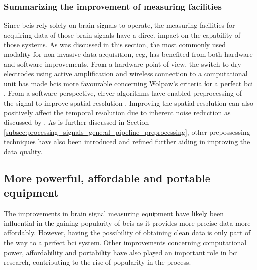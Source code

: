 
\subsubsection{Summarizing the improvement of measuring facilities}
\label{subsubsec:bci_gaining_popularity_better_measuring_summary}

Since \glspl{bci} rely solely on brain signals to operate, the measuring facilities for acquiring data of those brain signals have a direct impact on the capability of those systems.
As was discussed in this section, the most commonly used modality for non-invasive data acquisition, \gls{eeg}, has benefited from both hardware and software improvements.
From a hardware point of view, the switch to dry electrodes using active amplification and wireless connection to a computational unit has made \glspl{bci} more favourable concerning Wolpaw's criteria for a perfect \gls{bci} \citep{bluetooth_evaluation, wet_vs_dry, active_electrode_explained}.
From a software perspective, clever algorithms have enabled preprocessing of the signal to improve spatial resolution \citep{improve_eeg_spatial_laplacian1, improve_eeg_spatial_laplacian2, improve_eeg_spatial_laplacian3, improve_eeg_spatial_cnn}.
Improving the spatial resolution can also positively affect the temporal resolution due to inherent noise reduction as discussed by \citet{improve_eeg_spatial_comparison}. 
As is further discussed in Section \ref{subsec:processing_signals_general_pipeline_preprocessing}, other prepossessing techniques have also been introduced and refined further aiding in improving the data quality. 


\subsection{More powerful, affordable and portable equipment}
\label{subsec:bci_gaining_popularity_better_processing}

The improvements in brain signal measuring equipment have likely been influential in the gaining popularity of \glspl{bci} as it provides more precise data more affordably.
However, having the possibility of obtaining clean data is only part of the way to a perfect \gls{bci} system.
Other improvements concerning computational power, affordability and portability have also played an important role in \gls{bci} research, contributing to the rise of popularity in the process.

